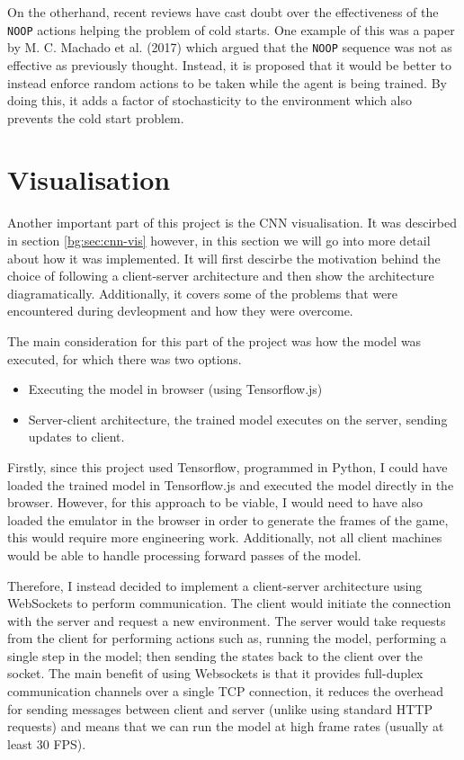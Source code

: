 On the otherhand, recent reviews have cast doubt over the effectiveness of the \texttt{NOOP} actions helping the problem of cold starts. One example of this was a paper by M. C. Machado et al. (2017) \cite{machado2017revisiting} which argued that the \texttt{NOOP} sequence was not as effective as previously thought. Instead, it is proposed that it would be better to instead enforce random actions to be taken while the agent is being trained. By doing this, it adds a factor of stochasticity to the environment which also prevents the cold start problem.

\section{Visualisation}

Another important part of this project is the CNN visualisation. It was descirbed in section \ref{bg:sec:cnn-vis} however, in this section we will go into more detail about how it was implemented. It will first descirbe the motivation behind the choice of following a client-server architecture and then show the architecture diagramatically. Additionally, it covers some of the problems that were encountered during devleopment and how they were overcome.

The main consideration for this part of the project was how the model was executed, for which there was two options.

\begin{itemize}
  \item Executing the model in browser (using Tensorflow.js)
  \item Server-client architecture, the trained model executes on the server, sending updates to client.
\end{itemize}

Firstly, since this project used Tensorflow, programmed in Python, I could have loaded the trained model in Tensorflow.js and executed the model directly in the browser. However, for this approach to be viable, I would need to have also loaded the emulator in the browser in order to generate the frames of the game, this would require more engineering work. Additionally, not all client machines would be able to handle processing forward passes of the model.

Therefore, I instead decided to implement a client-server architecture using WebSockets to perform communication. The client would initiate the connection with the server and request a new environment. The server would take requests from the client for performing actions such as, running the model, performing a single step in the model; then sending the states back to the client over the socket. The main benefit of using Websockets is that it provides full-duplex communication channels over a single TCP connection, it reduces the overhead for sending messages between client and server (unlike using standard HTTP requests) and means that we can run the model at high frame rates (usually at least 30 FPS).

